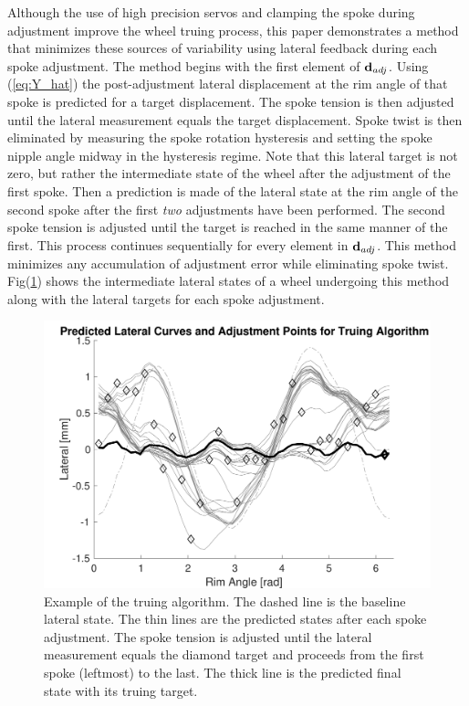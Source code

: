 \documentclass[journal]{IEEEtran}
\begin{document}
Although the use of high precision servos and clamping the spoke during adjustment improve the wheel truing process, this paper demonstrates a method that minimizes these sources of variability using lateral feedback during each spoke adjustment. The method begins with the first element of ${\bf d}_{adj}$. Using (\ref{eq:Y_hat}) the post-adjustment lateral displacement at the rim angle of that spoke is predicted for a target displacement.  The spoke tension is then adjusted until the lateral measurement equals the target displacement. Spoke twist is then eliminated by measuring the spoke rotation hysteresis and setting the spoke nipple angle midway in the hysteresis regime. Note that this lateral target is not zero, but rather the intermediate state of the wheel after the adjustment of the first spoke.  Then a prediction is made of the lateral state at the rim angle of the second spoke after the first \emph{two} adjustments have been performed.  The second spoke tension is adjusted until the target is reached in the same manner of the first. This process continues sequentially for every element in ${\bf d}_{adj}$. This method minimizes any accumulation of adjustment error while eliminating spoke twist.  Fig(\ref{fig:algo}) shows the intermediate lateral states of a wheel undergoing this method along with the lateral targets for each spoke adjustment. 

\begin{figure}[!t]
\centering
\includegraphics[width=3.5 in]{./figs/algo}
\caption{Example of the truing algorithm. The dashed line is the baseline lateral state.  The thin lines are the predicted states after each spoke adjustment. The spoke tension is adjusted until the lateral measurement equals the diamond target and proceeds from the first spoke (leftmost) to the last.  The thick line is the predicted final state with its truing target. }
\label{fig:algo}
\end{figure}
\end{document}
